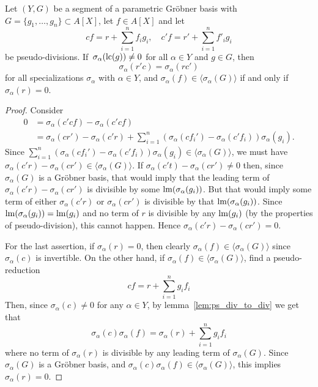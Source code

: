 \begin{lemma}\label{lem:ps_rem_unique}
  Let $(Y, G)$ be a segment of a parametric Gröbner basis with $G = \{g_{1}, \dots, g_{n}\} \subset A[X]$, let $f \in A[X]$ and let
  \[cf = r + \sum_{i=1}^{n} f_{i} g_{i}, \quad c'f = r' + \sum_{i=1}^{n} f'_{i} g_{i}\]
  be pseudo-divisions. If $\,\sigma_{\alpha}(\operatorname{lc}(g)) \neq 0$ for all $\alpha \in Y$ and $g \in G$, then
  \[\sigma_{\alpha}(r'c) = \sigma_{\alpha}(rc')\]
  for all specializations $\sigma_{\alpha}$ with $\alpha \in Y$, and $\sigma_{\alpha}(f) \in \langle \sigma_{\alpha}(G) \rangle$ if and only if $\sigma_{\alpha}(r) = 0$.
\end{lemma}
\begin{proof}
  Consider
  \begin{align*}
    0 &= \sigma_{\alpha}(c' c f) - \sigma_{\alpha}(c' c f) \\
      &= \sigma_{\alpha}(cr') - \sigma_{\alpha}(c'r) + \sum_{i=1}^{n}\left(\sigma_{\alpha}(c f_{i}') - \sigma_{\alpha}(c' f_{i})\right)\sigma_{\alpha}(g_{i}).
  \end{align*}
  Since $\sum_{i=1}^{n}(\sigma_{\alpha}(c f_{i}') - \sigma_{\alpha}(c' f_{i}))\sigma_{\alpha}(g_{i}) \in \langle \sigma_{\alpha}(G) \rangle$, we must have $\sigma_{\alpha}(c' r) - \sigma_{\alpha}(c r') \in \langle \sigma_{\alpha}(G) \rangle$. If $\sigma_{\alpha}(c't) - \sigma_{\alpha}(cr') \neq 0$ then, since $\sigma_{\alpha}(G)$ is a Gröbner basis, that would imply that the leading term of $\sigma_{\alpha}(c' r) - \sigma_{\alpha}(c r')$ is divisible by some $\operatorname{lm}(\sigma_{\alpha}(g_{i}))$. But that would imply some term of either $\sigma_{\alpha}(c' r)$ or $\sigma_{\alpha}(c r')$ is divisible by that $\operatorname{lm}(\sigma_{\alpha}(g_{i}))$. Since $\operatorname{lm}(\sigma_{\alpha}(g_{i})) = \operatorname{lm}(g_{i})$ and no term of $r$ is divisible by any $\operatorname{lm}(g_{i})$ (by the properties of pseudo-division), this cannot happen. Hence $\sigma_{\alpha}(c' r) - \sigma_{\alpha}(c r') = 0$.

  For the last assertion, if $\sigma_{\alpha}(r) = 0$, then clearly $\sigma_{\alpha}(f) \in \langle \sigma_{\alpha}(G) \rangle$ since $\sigma_{\alpha}(c)$ is invertible. On the other hand, if $\sigma_{\alpha}(f) \in \langle \sigma_{\alpha}(G) \rangle$, find a pseudo-reduction
  \[c f = r + \sum_{i=1}^{n} g_{i} f_{i}\]
  Then, since $\sigma_{\alpha}(c) \neq 0$ for any $\alpha \in Y$, by lemma~\ref{lem:ps_div_to_div} we get that
  \[\sigma_{\alpha}(c)\sigma_{\alpha}(f) = \sigma_{\alpha}(r) + \sum_{i=1}^{n} g_{i} f_{i}\]
  where no term of $\sigma_{\alpha}(r)$ is divisible by any leading term of $\sigma_{\alpha}(G)$. Since $\sigma_{\alpha}(G)$ is a Gröbner basis, and $\sigma_{\alpha}(c) \sigma_{\alpha}(f) \in \langle \sigma_{\alpha}(G) \rangle$, this implies $\sigma_{\alpha}(r) = 0$.
\end{proof}

